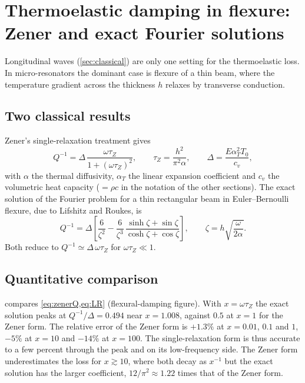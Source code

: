 \section{Thermoelastic damping in flexure: Zener and exact Fourier solutions}\label{sec:flexted}

Longitudinal waves (\cref{sec:classical}) are only one setting for the thermoelastic loss. In micro-resonators the dominant case is flexure of a thin beam, where the temperature gradient across the thickness $h$ relaxes by transverse conduction.

\subsection{Two classical results}
Zener's single-relaxation treatment gives
\begin{equation}\label{eq:zenerQ}
Q^{-1}=\Delta\,\frac{\omega\tau_Z}{1+(\omega\tau_Z)^2},\qquad \tau_Z=\frac{h^2}{\pi^2\alpha},\qquad \Delta=\frac{E\alpha_T^2T_0}{c_v},
\end{equation}
with $\alpha$ the thermal diffusivity, $\alpha_T$ the linear expansion coefficient and $c_v$ the volumetric heat capacity ($=\rho c$ in the notation of the other sections). The exact solution of the Fourier problem for a thin rectangular beam in Euler--Bernoulli flexure, due to Lifshitz and Roukes, is
\begin{equation}\label{eq:LR}
Q^{-1}=\Delta\left[\frac{6}{\zeta^{2}}-\frac{6}{\zeta^{3}}\,\frac{\sinh\zeta+\sin\zeta}{\cosh\zeta+\cos\zeta}\right],\qquad \zeta=h\sqrt{\frac{\omega}{2\alpha}} .
\end{equation}
Both reduce to $Q^{-1}\simeq\Delta\,\omega\tau_Z$ for $\omega\tau_Z\ll1$.

\subsection{Quantitative comparison}
 compares \cref{eq:zenerQ,eq:LR} (flexural-damping figure). With $x=\omega\tau_Z$ the exact solution peaks at $Q^{-1}/\Delta=0.494$ near $x=1.008$, against $0.5$ at $x=1$ for the Zener form. The relative error of the Zener form is $+1.3\%$ at $x=0.01$, $0.1$ and $1$, $-5\%$ at $x=10$ and $-14\%$ at $x=100$. The single-relaxation form is thus accurate to a few percent through the peak and on its low-frequency side. The Zener form underestimates the loss for $x\gtrsim10$, where both decay as $x^{-1}$ but the exact solution has the larger coefficient, $12/\pi^2\approx1.22$ times that of the Zener form.

